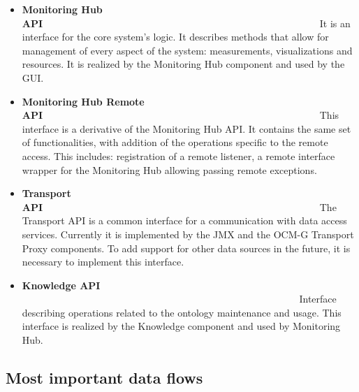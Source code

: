 \begin{itemize}

\item {\bf Monitoring Hub API}~~~~~~~~~~~~~~~~~~~~~~~~~~~~~~~~~~~~~~~~~~~~~~~~~~~~~~~~\linebreak
It is an interface for the core system's logic. It describes methods that allow for management of every aspect of the system:  measurements, visualizations and resources. It is realized by the Monitoring Hub component and used by the GUI. 

\item {\bf Monitoring Hub Remote API}~~~~~~~~~~~~~~~~~~~~~~~~~~~~~~~~~~~~~~~~~~~~~~~~~~~~~~~~\linebreak
This interface is a derivative of the Monitoring Hub API. It contains the same set of functionalities, with addition of the operations specific to the remote access. This includes: registration of a remote listener, a remote interface wrapper for the Monitoring Hub allowing passing remote exceptions.

\item {\bf Transport API}~~~~~~~~~~~~~~~~~~~~~~~~~~~~~~~~~~~~~~~~~~~~~~~~~~~~~~~~\linebreak
The Transport API is a common interface for a communication with data access services. Currently it is implemented by the JMX and the OCM-G Transport Proxy components. To add support for other data sources in the future, it is necessary to implement this interface.

\item {\bf Knowledge API} ~~~~~~~~~~~~~~~~~~~~~~~~~~~~~~~~~~~~~~~~~~~~~~~~~~~~~~~~\linebreak
Interface describing operations related to the ontology maintenance and usage. This interface is realized by the Knowledge component and used by Monitoring Hub. 

\end{itemize}

\subsection{Most important data flows}

